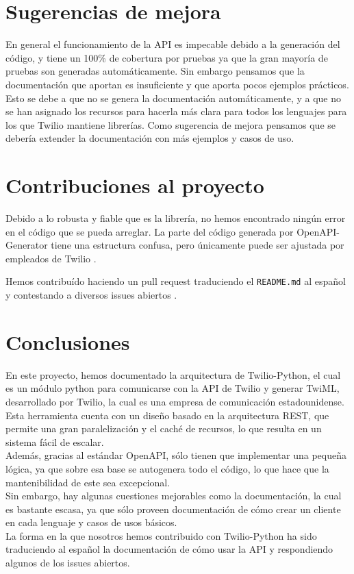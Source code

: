 \documentclass{article}
\begin{document}
\section{Sugerencias de mejora}

En general el funcionamiento de la API es impecable
debido a la generación del código,
y tiene un 100\% de cobertura por pruebas
ya que la gran mayoría de pruebas son generadas automáticamente.
Sin embargo pensamos que la documentación que aportan es insuficiente
y que aporta pocos ejemplos prácticos.
Esto se debe a que no se genera la documentación automáticamente,
y a que no se han asignado los recursos para hacerla más clara
para todos los lenguajes para los que Twilio mantiene librerías.
Como sugerencia de mejora
pensamos que se debería extender la documentación
con más ejemplos y casos de uso.

\section{Contribuciones al proyecto}

Debido a lo robusta y fiable que es la librería,
no hemos encontrado ningún error en el código que se pueda arreglar.
La parte del código generada por OpenAPI-Generator
tiene una estructura confusa,
pero únicamente puede ser ajustada por empleados de Twilio \cite{contributing}.

Hemos contribuído haciendo un pull request
traduciendo el \verb|README.md| al español
\cite{contribución-readme}
y contestando a diversos issues abiertos
\cite{contribución-repeated-code}
\cite{contribución-security-improvements}
\cite{contribución-wrong-login}.

\section{Conclusiones}

En este proyecto, hemos documentado la arquitectura de Twilio-Python, el cual es un módulo python para comunicarse con la API de Twilio y generar TwiML, desarrollado por Twilio, la cual es una empresa de comunicación estadounidense.\\
Esta herramienta cuenta con un diseño basado en la arquitectura REST, que permite una gran paralelización y el caché de recursos, lo que resulta en un sistema fácil de escalar.\\
Además, gracias al estándar OpenAPI, sólo tienen que implementar una pequeña lógica, ya que sobre esa base se autogenera todo el código, lo que hace que la mantenibilidad de este sea excepcional.\\
Sin embargo, hay algunas cuestiones mejorables como la documentación, la cual es bastante escasa, ya que sólo proveen documentación de cómo crear un cliente en cada lenguaje y casos de usos básicos. \\
La forma en la que nosotros hemos contribuido con Twilio-Python ha sido traduciendo al español la documentación de cómo usar la API y respondiendo algunos de los issues abiertos.

\newpage

\printbibliography
\end{document}
